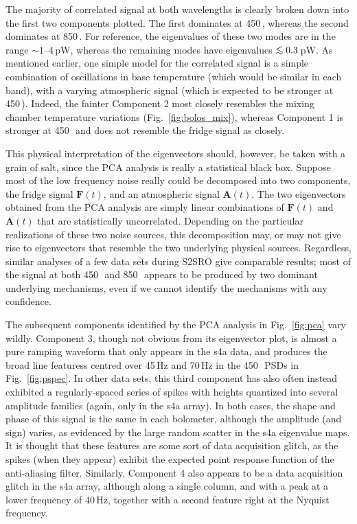 \documentclass[useAMS,usenatbib,nofootinbib]{mn2e}
\def\lsim{\mathrel{\lower2.5pt\vbox{\lineskip=0pt\baselineskip=0pt
          \hbox{$<$}\hbox{$\sim$}}}}
\begin{document}
The majority of correlated signal at both wavelengths is clearly
broken down into the first two components plotted. The first dominates
at 450\,\micron, whereas the second dominates at 850\,\micron. For
reference, the eigenvalues of these two modes are in the range
$\sim1$--4\,pW, whereas the remaining modes have eigenvalues
$\lsim0.3$\,pW. As mentioned earlier, one simple model for the
correlated signal is a simple combination of oscillations in base
temperature (which would be similar in each band), with a varying
atmospheric signal (which is expected to be stronger at
450\,\micron). Indeed, the fainter Component 2 most closely resembles
the mixing chamber temperature variations (Fig.~\ref{fig:bolos_mix}),
whereas Component 1 is stronger at 450\,\micron\ and does not resemble
the fridge signal as closely.

This physical interpretation of the eigenvectors should, however, be
taken with a grain of salt, since the PCA analysis is really a
statistical black box. Suppose most of the low frequency noise really
could be decomposed into two components, the fridge signal
$\mathbf{F}(t)$, and an atmospheric signal $\mathbf{A}(t)$. The two
eigenvectors obtained from the PCA analysis are simply linear
combinations of $\mathbf{F}(t)$ and $\mathbf{A}(t)$ that are
statistically uncorrelated. Depending on the particular realizations
of these two noise sources, this decomposition may, or may not give
rise to eigenvectors that resemble the two underlying physical
sources. Regardless, similar analyses of a few data sets during S2SRO
give comparable results; most of the signal at both 450\,\micron\ and
850\,\micron\ appears to be produced by two dominant underlying
mechanisms, even if we cannot identify the mechanisms with any
confidence.

The subsequent components identified by the PCA analysis in
Fig.~\ref{fig:pca} vary wildly. Component 3, though not obvious from
its eigenvector plot, is almost a pure ramping waveform that only
appears in the s4a data, and produces the broad line featuress centred
over 45\,Hz and 70\,Hz in the 450\,\micron\ PSDs in
Fig.~\ref{fig:pspec}. In other data sets, this third component has
also often instead exhibited a regularly-spaced series of spikes with
heights quantized into several amplitude families (again, only in the
s4a array). In both cases, the shape and phase of this signal is the
same in each bolometer, although the amplitude (and sign) varies, as
evidenced by the large random scatter in the s4a eigenvalue maps. It
is thought that these features are some sort of data acquisition
glitch, as the spikes (when they appear) exhibit the expected point
response function of the anti-aliasing filter. Similarly, Component 4
also appears to be a data acquisition glitch in the s4a array,
although along a single column, and with a peak at a lower frequency
of 40\,Hz, together with a second feature right at the Nyquist
frequency.
\end{document}
